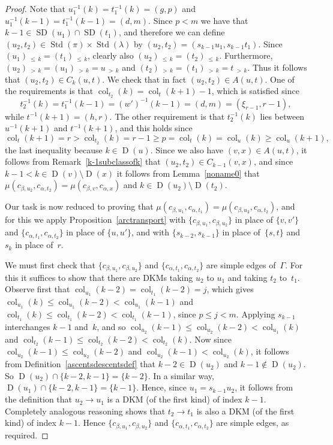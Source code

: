 \documentclass[10pt]{amsart}
\theoremstyle{definition}
\DeclareMathOperator{\col}{col}
\newcommand{\morethan}[2]{#1\,{_{>\,#2}}}
\newcommand{\Lessthan}[2]{#1\,{_{\leqslant\,#2}}}
\DeclareMathOperator{\STD}{Std}
\DeclareMathOperator{\SD}{SD}
\DeclareMathOperator{\D}{D}
\begin{document}
\begin{proof}
Note that $u_1^{-1}(k)=t_1^{-1}(k)=(g,p)$ and $u_1^{-1}(k-1)=t_1^{-1}(k-1)=(d,m)$.
Since $p<m$ we have that $k-1\in\SD(u_1)\cap\SD(t_1)$, and therefore we can define
$(u_2,t_2)\in\STD(\pi)\times\STD(\lambda)$ by $(u_2,t_2)=(s_{k-1}u_1,s_{k-1}t_1)$.
Since $\Lessthan{(u_1)}k=\Lessthan{(t_1)}k$, clearly also
$\Lessthan{(u_2)}k=\Lessthan{(t_2)}k$. Furthermore,
$\morethan{(u_2)}k=\morethan{(u_1)}k=\morethan uk$ and
$\morethan{(t_2)}k=\morethan{(t_1)}k=\morethan tk$. Thus it follows that
$(u_2,t_2)\in C_k(u,t)$. We check that in fact $(u_2,t_2)\in A(u,t)$. One of the
requirements is that $\col_{t_2}(k)=\col_t(k+1)-1$, which is satisfied
since
\[
t_2^{-1}(k)=t_1^{-1}(k-1)=(w')^{-1}(k-1)=(d,m)=(\xi_{r-1},r-1),
\]
while $t^{-1}(k+1)=(h,r)$. The other requirement is that $t_2^{-1}(k)$ lies
between $u^{-1}(k+1)$ and $t^{-1}(k+1)$, and this holds since
\[
\col_t(k+1)=r>\col_{t_2}(k)=r-1\geqslant p=\col_t(k)=\col_u(k)\geqslant\col_u(k+1),
\]
the last inequality because $k\in\D(u)$. Since we also have $(v,x)\in A(u,t)$,
it follows from Remark~\ref{k-1subclassofk} that $(u_2,t_2)\in C_{k-1}(v,x)$,
and since $k-1<k\in\D(v)\setminus\D(x)$ it follows from Lemma~\ref{noname0}
that $\mu(c_{\beta,u_2},c_{\alpha,t_2})=\mu(c_{\beta,v},c_{\alpha,x})$
and $k\in\D(u_2)\setminus\D(t_2)$.

Our task is now reduced to proving that
$\mu(c_{\beta,u_1},c_{\alpha,t_1})=\mu(c_{\beta,u_2},c_{\alpha,t_2})$,
and for this we apply Proposition~\ref{arctransport} with
$\{c_{\beta,u_1},c_{\beta,u_2}\}$ in place of $\{v,v'\}$ and
$\{c_{\alpha,t_1},c_{\alpha,t_2}\}$ in place of $\{u,u'\}$, and with
$\{s_{k-2},s_{k-1}\}$ in place of~$\{s,t\}$ and $s_k$ in place of~$r$.

We must first check that $\{c_{\beta,u_1},c_{\beta,u_2}\}$ and
$\{c_{\alpha,t_1},c_{\alpha,t_2}\}$ are simple edges of~$\Gamma$. For this
it suffices to show that there are DKMs taking $u_2$ to $u_1$ and
taking $t_2$ to~$t_1$. Observe first that
$\col_{u_1}(k-2)=\col_{t_1}(k-2)=j$, which gives
$\col_{u_1}(k)\leqslant\col_{u_1}(k-2)<\col_{u_1}(k-1)$ and
$\col_{t_1}(k)\leqslant\col_{t_1}(k-2)<\col_{t_1}(k-1)$,
since $p\leqslant j<m$. Applying $s_{k-1}$ interchanges $k-1$ and~$k$,
and so
$\col_{u_2}(k-1)\leqslant\col_{u_2}(k-2)<\col_{u_1}(k)$ and
$\col_{t_2}(k-1)\leqslant\col_{t_2}(k-2)<\col_{t_2}(k)$.
Now since $\col_{u_2}(k-1)\leqslant\col_{u_2}(k-2)$ and $\col_{u_2}(k-1)<\col_{u_2}(k)$,
it follows from Definition~\ref{ascentsdescentsdef} that $k-2\in\D(u_2)$
and $k-1\notin\D(u_2)$. So $\D(u_2)\cap \{k-2,k-1\}=\{k-2\}$. In a similar
way, $\D(u_1)\cap \{k-2,k-1\}=\{k-1\}$. Hence, since $u_1=s_{k-1}u_2$, it follows
from the definition that $u_2\to u_1$ is a DKM (of the first kind) of index $k-1$.
Completely analogous reasoning shows that $t_2\to t_1$ is also a DKM (of the
first kind) of index $k-1$. Hence $\{c_{\beta,u_1},c_{\beta,u_2}\}$ and
$\{c_{\alpha,t_1},c_{\alpha,t_2}\}$ are simple edges, as required.


\end{proof}
\end{document}
